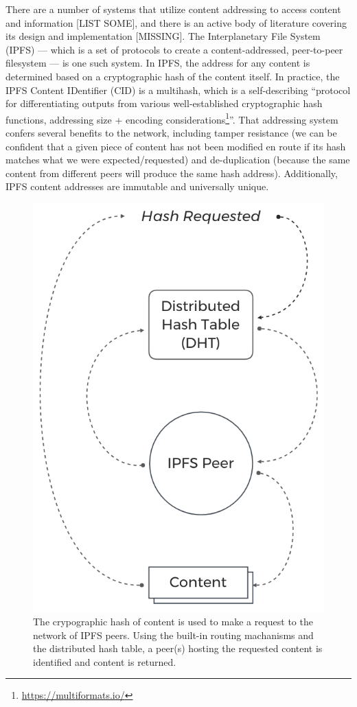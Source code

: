 \documentclass{textile}
\begin{document}
There are a number of systems that utilize content addressing to access content and information [LIST SOME], and there is an active body of literature covering its design and implementation [MISSING]. The Interplanetary File System (IPFS) --- which is a set of protocols to create a content-addressed, peer-to-peer filesystem \cite{benetIPFSContentAddressed2014} --- is one such system. In IPFS, the address for any content is determined based on a cryptographic hash of the content itself. In practice, the IPFS Content IDentifier (CID) is a multihash, which is a self-describing ``protocol for differentiating outputs from various well-established cryptographic hash functions, addressing size + encoding considerations\footnote{\url{https://multiformats.io/}}''. That addressing system confers several benefits to the network, including tamper resistance (we can be confident that a given piece of content has not been modified en route if its hash matches what we were expected/requested) and de-duplication (because the same content from different peers will produce the same hash address). Additionally, IPFS content addresses are immutable and universally unique.

\begin{figure}
  \includegraphics[width=\linewidth]{figures/Hash_Request.png}
  \caption{The crypographic hash of content is used to make a request to the network of IPFS peers. Using the built-in routing machanisms and the distributed hash table, a peer(s) hosting the requested content is identified and content is returned. }
  \label{fig:contentaddressing}
\end{figure}
\end{document}
